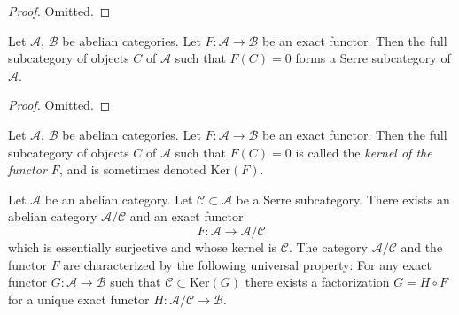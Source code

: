 \begin{proof}
Omitted.
\end{proof}

\begin{lemma}
\label{lemma-kernel-exact-functor}
Let $\mathcal{A}$, $\mathcal{B}$ be abelian categories.
Let $F : \mathcal{A} \to \mathcal{B}$ be an exact functor.
Then the full subcategory of objects $C$ of $\mathcal{A}$
such that $F(C) = 0$ forms a Serre subcategory of $\mathcal{A}$.
\end{lemma}

\begin{proof}
Omitted.
\end{proof}

\begin{definition}
\label{definition-kernel-category}
Let $\mathcal{A}$, $\mathcal{B}$ be abelian categories.
Let $F : \mathcal{A} \to \mathcal{B}$ be an exact functor.
Then the full subcategory of objects $C$ of $\mathcal{A}$
such that $F(C) = 0$ is called the {\it kernel of the functor $F$},
and is sometimes denoted $\text{Ker}(F)$.
\end{definition}

\begin{lemma}
\label{lemma-serre-subcategory-is-kernel}
Let $\mathcal{A}$ be an abelian category.
Let $\mathcal{C} \subset \mathcal{A}$ be a Serre subcategory.
There exists an abelian category $\mathcal{A}/\mathcal{C}$
and an exact functor
$$
F : \mathcal{A} \longrightarrow \mathcal{A}/\mathcal{C}
$$
which is essentially surjective and whose kernel is $\mathcal{C}$.
The category $\mathcal{A}/\mathcal{C}$ and the functor $F$ are
characterized by the following universal property: For any exact
functor $G : \mathcal{A} \to \mathcal{B}$ such that
$\mathcal{C} \subset \text{Ker}(G)$ there exists a factorization
$G = H \circ F$ for a unique exact functor
$H : \mathcal{A}/\mathcal{C} \to \mathcal{B}$.
\end{lemma}

